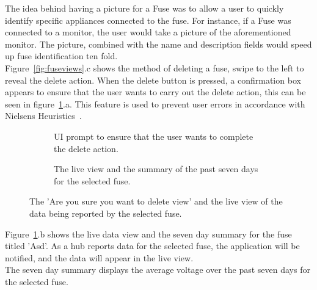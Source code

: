 \documentclass[preprint,12pt,3p]{elsarticle}
\begin{document}
The idea behind having a picture for a Fuse was to allow a user to quickly identify specific appliances connected to the fuse. For instance, if a Fuse was connected to a monitor, the user would take a picture of the aforementioned monitor. The picture, combined with the name and description fields would speed up fuse identification ten fold.\\
Figure~\ref{fig:fuseviews}.c shows the method of deleting a fuse, swipe to the left to reveal the delete action. When the delete button is pressed, a confirmation box appears to ensure that the user wants to carry out the delete action, this can be seen in figure~\ref{fig:deletelive}.a. This feature is used to prevent user errors in accordance with Nielsens Heuristics~\cite{nielsen}.

\begin{figure}[H]
    \centering
    \begin{subfigure}[t]{0.32\columnwidth}
        \centering
        \caption{UI prompt to ensure that the user wants to complete the delete action.}
    \end{subfigure}
    \begin{subfigure}[t]{0.32\columnwidth}
        \centering
        \caption{The live view and the summary of the past seven days for the selected fuse.}
    \end{subfigure}
    \caption{The 'Are you sure you want to delete view' and the live view of the data being reported by the selected fuse.}
    \label{fig:deletelive}
\end{figure}
Figure~\ref{fig:deletelive}.b shows the live data view and the seven day summary for the fuse titled 'Asd'. As a hub reports data for the selected fuse, the application will be notified, and the data will appear in the live view.\\
The seven day summary displays the average voltage over the past seven days for the selected fuse.
\end{document}
